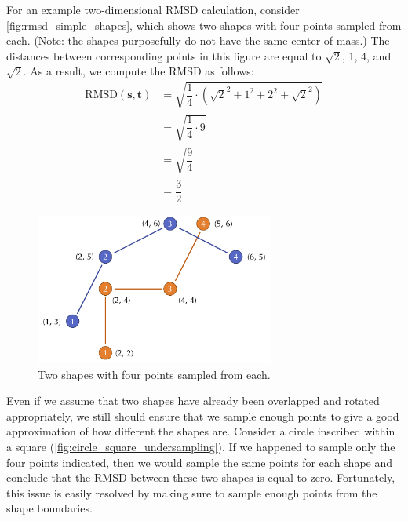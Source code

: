 \begin{note}\end{note}

For an example two-dimensional RMSD calculation, consider \autoref{fig:rmsd_simple_shapes}, which shows two shapes with four points sampled from each. (Note: the shapes purposefully do not have the same center of mass.) The distances between corresponding points in this figure are equal to $\sqrt{2}$, 1, 4, and $\sqrt{2}$. As a result, we compute the RMSD as follows:
\begin{align*}
	\text{RMSD}(\mathbf{s}, \mathbf{t}) &= \sqrt{\dfrac{1}{4} \cdot (\sqrt{2}^2 + 1^2 + 2^2 + \sqrt{2}^2)} \\
	&= \sqrt{\dfrac{1}{4} \cdot 9}\\
	&= \sqrt{\dfrac{9}{4}}\\
	&= \dfrac{3}{2}
\end{align*}

\begin{figure}[h]
	\centering
	\mySfFamily
	\includegraphics[width = 0.7\textwidth]{../images/rmsd_simple_shapes.png}
	\caption{Two shapes with four points sampled from each.}
	\label{fig:rmsd_simple_shapes}
\end{figure}

\begin{qbox}\end{qbox}

Even if we assume that two shapes have already been overlapped and rotated appropriately, we still should ensure that we sample enough points to give a good approximation of how different the shapes are. Consider a circle inscribed within a square (\autoref{fig:circle_square_undersampling}). If we happened to sample only the four points indicated, then we would sample the same points for each shape and conclude that the RMSD between these two shapes is equal to zero. Fortunately, this issue is easily resolved by making sure to sample enough points from the shape boundaries.\\

